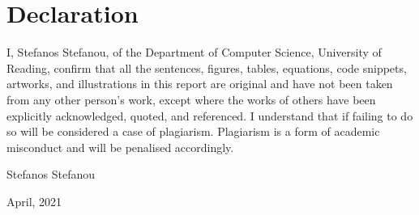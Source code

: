 \documentclass[a4paper,11pt,oneside]{book}
\begin{document}
    \newpage
    \thispagestyle{empty}
    \chapter*{\Large Declaration}
    I, Stefanos Stefanou, of the Department of Computer Science, University of Reading, confirm that all the sentences, figures, tables, equations, code snippets, artworks, and illustrations in this report are original and have not been taken from any other person's work, except where the works of others have been explicitly acknowledged, quoted, and referenced. I understand that if failing to do so will be considered a case of plagiarism. Plagiarism is a form of academic misconduct and will be penalised accordingly.\\[1cm]
    
    
    \begin{flushright}
        Stefanos Stefanou %
        
        April, 2021
    \end{flushright}
     
    
    
   
    
    
    \tableofcontents
    
    \mainmatter
    
\end{document}
